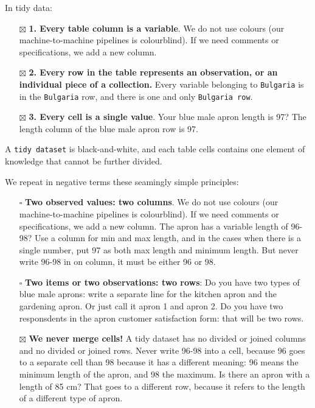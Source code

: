 \documentclass[
  letterpaper,
  DIV=11,
  numbers=noendperiod]{scrreprt}
\begin{document}
In tidy data:

\begin{itemize}
\item[$\boxtimes$]
  \textbf{1. Every table column is a variable}. We do not use colours
  (our machine-to-machine pipelines is colourblind). If we need comments
  or specifications, we add a new column.
\item[$\boxtimes$]
  \textbf{2. Every row in the table represents an observation, or an
  individual piece of a collection.} Every variable belonging to
  \texttt{Bulgaria} is in the \texttt{Bulgaria} row, and there is one
  and only \texttt{Bulgaria\ row}.
\item[$\boxtimes$]
  \textbf{3. Every cell is a single value}. Your blue male apron length
  is 97? The length column of the blue male apron row is 97.
\end{itemize}

\begin{tcolorbox}[enhanced jigsaw, opacityback=0, bottomrule=.15mm, rightrule=.15mm, toptitle=1mm, breakable, colbacktitle=quarto-callout-note-color!10!white, colback=white, title=\textcolor{quarto-callout-note-color}{\faInfo}\hspace{0.5em}{Note}, leftrule=.75mm, toprule=.15mm, left=2mm, arc=.35mm, colframe=quarto-callout-note-color-frame, coltitle=black, titlerule=0mm, bottomtitle=1mm, opacitybacktitle=0.6]

A \texttt{tidy\ dataset} is black-and-white, and each table cells
contains one element of knowledge that cannot be further divided.

\end{tcolorbox}

We repeat in negative terms these seamingly simple principles:

\begin{itemize}
\item[$\square$]
  \textbf{Two observed values: two columns}. We do not use colours (our
  machine-to-machine pipelines is colourblind). If we need comments or
  specifications, we add a new column. The apron has a variable length
  of 96-98? Use a column for min and max length, and in the cases when
  there is a single number, put 97 as both max length and minimum
  length. But never write 96-98 in on column, it must be either 96 or
  98.
\item[$\square$]
  \textbf{Two items or two observations: two rows}: Do you have two
  types of blue male aprons: write a separate line for the kitchen apron
  and the gardening apron. Or just call it apron 1 and apron 2. Do you
  have two responsdents in the apron customer satisfaction form: that
  will be two rows.
\item[$\boxtimes$]
  \textbf{We never merge cells!} A tidy dataset has no divided or joined
  columns and no divided or joined rows. Never write 96-98 into a cell,
  because 96 goes to a separate cell than 98 because it has a different
  meaning: 96 means the minimum length of the apron, and 98 the maximum.
  Is there an apron with a length of 85 cm? That goes to a different
  row, because it refers to the length of a different type of apron.
\end{itemize}
\end{document}
